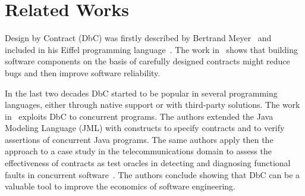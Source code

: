 \section{Related Works}\label{sec:relatedWorks}

Design by Contract (DbC) was firstly described by Bertrand Meyer~\cite{ii1} and included %
in his Eiffel programming language~\cite{ii}. %
The work in~\cite{ii} shows that building software components on the basis of carefully designed contracts might reduce bugs and then improve 
software reliability. %

In the last two decades DbC started to be popular in several programming languages, either through native support or with third-party solutions. 
The work in~\cite{Araujo2011} exploits DbC to concurrent programs. The authors extended the Java Modeling Language (JML) with constructs to specify  contracts %
and to %
verify assertions of concurrent Java programs. 
The same authors apply then the approach to a case study in %
the telecommunications domain to assess the effectiveness of contracts as test oracles in detecting and diagnosing functional faults in concurrent software~\cite{Araujo2014}. The authors conclude showing that DbC can be a valuable tool to improve the economics of software engineering.


